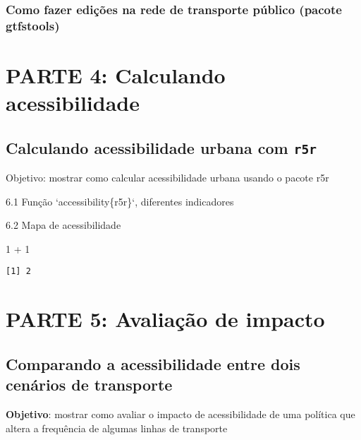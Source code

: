 \documentclass[
  letterpaper,
  DIV=11,
  numbers=noendperiod]{scrreprt}
\newenvironment{Shaded}{\begin{snugshade}}{\end{snugshade}}
\newcommand{\DecValTok}[1]{\textcolor[rgb]{0.68,0.00,0.00}{#1}}
\newcommand{\SpecialCharTok}[1]{\textcolor[rgb]{0.37,0.37,0.37}{#1}}
\begin{document}
\hypertarget{como-fazer-ediuxe7uxf5es-na-rede-de-transporte-puxfablico-pacote-gtfstools}{%
\section{Como fazer edições na rede de transporte público (pacote
gtfstools)}\label{como-fazer-ediuxe7uxf5es-na-rede-de-transporte-puxfablico-pacote-gtfstools}}

\part{PARTE 4: Calculando acessibilidade}

\hypertarget{calculando-acessibilidade-urbana-com-r5r}{%
\chapter{\texorpdfstring{Calculando acessibilidade urbana com
\texttt{r5r}}{Calculando acessibilidade urbana com r5r}}\label{calculando-acessibilidade-urbana-com-r5r}}

Objetivo: mostrar como calcular acessibilidade urbana usando o pacote
r5r

6.1 Função `accessibility\{r5r\}`, diferentes indicadores

6.2 Mapa de acessibilidade

\begin{Shaded}
\begin{Highlighting}[]
\DecValTok{1} \SpecialCharTok{+} \DecValTok{1}
\end{Highlighting}
\end{Shaded}

\begin{verbatim}
[1] 2
\end{verbatim}

\part{PARTE 5: Avaliação de impacto}

\hypertarget{comparando-a-acessibilidade-entre-dois-cenuxe1rios-de-transporte}{%
\chapter{Comparando a acessibilidade entre dois cenários de
transporte}\label{comparando-a-acessibilidade-entre-dois-cenuxe1rios-de-transporte}}

\textbf{Objetivo}: mostrar como avaliar o impacto de acessibilidade de
uma política que altera a frequência de algumas linhas de transporte
\end{document}
